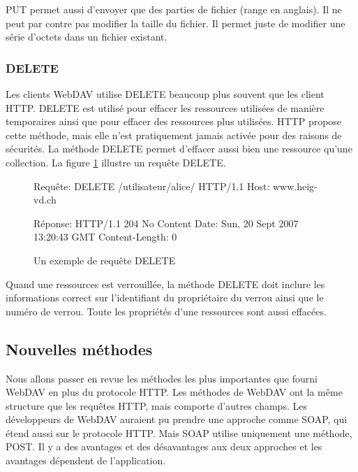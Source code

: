 \documentclass[a4paper, 11pt]{article}
\begin{document}
{			PUT permet aussi d'envoyer que des parties de fichier (range en anglais). Il ne peut par contre pas modifier la taille du fichier. Il permet juste de modifier une série d'octets dans un fichier existant.
	
			
		\subsubsection{DELETE}
		
			Les clients WebDAV utilise DELETE beaucoup plus souvent que les client HTTP. DELETE est utilisé pour effacer les ressources utilisées de manière temporaires ainsi que pour effacer des ressources plus utilisées. HTTP propose cette méthode, mais elle n'est pratiquement jamais activée pour des raisons de sécurités. La méthode DELETE permet d'effacer aussi bien une ressource qu'une collection. La figure \ref{fig:rep_delete} illustre un requête DELETE.
			
			\begin{figure}[ht]
			\begin{center}
			\begin{boxedverbatim}
				Requête:
				DELETE /utilisateur/alice/ HTTP/1.1
				Host: www.heig-vd.ch
			
				Réponse: 
				HTTP/1.1 204 No Content
				Date: Sun, 20 Sept 2007 13:20:43 GMT
				Content-Length: 0
			\end{boxedverbatim}
			\caption{Un exemple de requête DELETE}
			\label{fig:rep_delete}
			\end{center}
			\end{figure}
			
			Quand une ressources est verrouillée, la méthode DELETE doit inclure les informations correct sur l'identifiant du propriétaire du verrou ainsi que le numéro de verrou. Toute les propriétés d'une ressources sont aussi effacées.
	
	\subsection{Nouvelles méthodes}
		
		Nous allons passer en revue les méthodes les plus importantes que fourni WebDAV en plus du protocole HTTP. Les méthodes de WebDAV ont la même structure que les requêtes HTTP, mais comporte d'autres champs. Les développeurs de WebDAV auraient pu prendre une approche comme SOAP, qui étend aussi sur le protocole HTTP. Mais SOAP utilise uniquement une méthode, POST. Il y a des avantages et des désavantages aux deux approches et les avantages dépendent de l'application.
		
}
\end{document}
